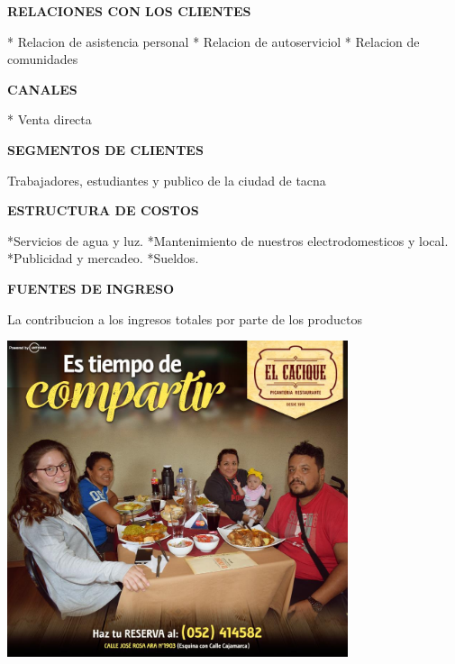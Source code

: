 \begin{enumerate}[1.]
\begin{center}
\textbf {RELACIONES CON LOS CLIENTES} \newline
\end{center}
* Relacion de asistencia personal\newline
* Relacion de autoserviciol\newline
* Relacion de comunidades\newline
\\ 

\begin{center}
\textbf {CANALES} \newline
\end{center}
* Venta directa\newline
\\ 

\begin{center}
\textbf {SEGMENTOS DE CLIENTES} \newline
\end{center}
Trabajadores, estudiantes y publico de la ciudad de tacna  \newline
\\ 
\begin{center}
\textbf {ESTRUCTURA DE COSTOS} \newline
\end{center}
*Servicios de agua y luz.  \newline
*Mantenimiento de nuestros electrodomesticos y local.  \newline
*Publicidad y mercadeo.  \newline
*Sueldos.  \newline
\\ 

\begin{center}
\textbf {FUENTES DE INGRESO} \newline
\\
\end{center}
La contribucion a los ingresos totales por parte de los productos  \newline
\\ 

	\begin{center}
	\includegraphics[width=10cm]{./Imagenes/clientes} 
	\end{center}


\end{enumerate}
